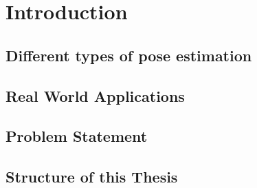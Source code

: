 \documentclass[./main.tex]{subfiles}
\begin{document}
\section{Introduction}
\subsection*{Different types of pose estimation}

\subsection*{Real World Applications}

\subsection*{Problem Statement}

\subsection*{Structure of this Thesis}
\end{document}
